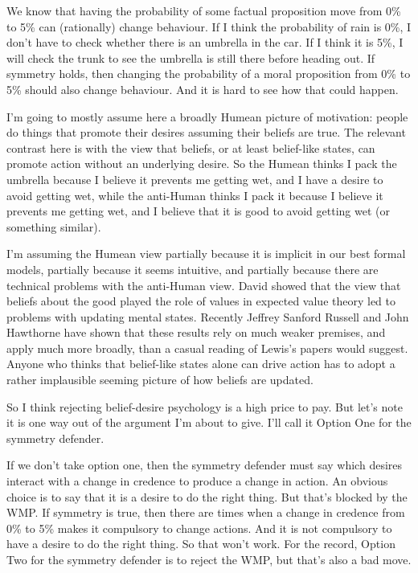 We know that having the probability of some factual proposition move from 0\% to 5\% can (rationally) change behaviour. If I think the probability of rain is 0\%, I don't have to check whether there is an umbrella in the car. If I think it is 5\%, I will check the trunk to see the umbrella is still there before heading out. If symmetry holds, then changing the probability of a moral proposition from 0\% to 5\% should also change behaviour. And it is hard to see how that could happen.

I'm going to mostly assume here a broadly Humean picture of motivation: people do things that promote their desires assuming their beliefs are true. The relevant contrast here is with the view that beliefs, or at least belief-like states, can promote action without an underlying desire. So the Humean thinks I pack the umbrella because I believe it prevents me getting wet, and I have a desire to avoid getting wet, while the anti-Human thinks I pack it because I believe it prevents me getting wet, and I believe that it is good to avoid getting wet (or something similar).

I'm assuming the Humean view partially because it is implicit in our best formal models, partially because it seems intuitive, and partially because there are technical problems with the anti-Human view. David \citet{Lewis1988b, Lewis1996a} showed that the view that beliefs about the good played the role of values in expected value theory led to problems with updating mental states. Recently Jeffrey Sanford Russell and John Hawthorne \citeyearpar{RussellHawthorne2016} have shown that these results rely on much weaker premises, and apply much more broadly, than a casual reading of Lewis's papers would suggest. Anyone who thinks that belief-like states alone can drive action has to adopt a rather implausible seeming picture of how beliefs are updated.

So I think rejecting belief-desire psychology is a high price to pay. But let's note it is one way out of the argument I'm about to give. I'll call it Option One for the symmetry defender.

If we don't take option one, then the symmetry defender must say which desires interact with a change in credence to produce a change in action. An obvious choice is to say that it is a desire to do the right thing. But that's blocked by the WMP. If symmetry is true, then there are times when a change in credence from 0\% to 5\% makes it compulsory to change actions. And it is not compulsory to have a desire to do the right thing. So that won't work. For the record, Option Two for the symmetry defender is to reject the WMP, but that's also a bad move.

